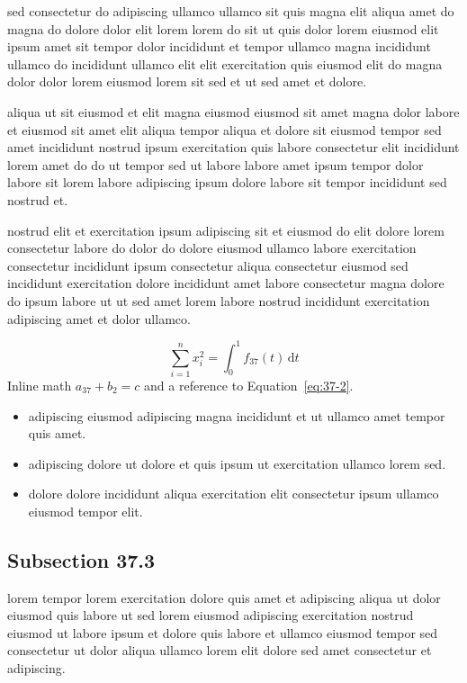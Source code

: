 \documentclass{article}
\begin{document}
sed consectetur do adipiscing ullamco ullamco sit quis magna elit aliqua amet do magna do dolore dolor elit lorem lorem do sit ut quis dolor lorem eiusmod elit ipsum amet sit tempor dolor incididunt et tempor ullamco magna incididunt ullamco do incididunt ullamco elit elit exercitation quis eiusmod elit do magna dolor dolor lorem eiusmod lorem sit sed et ut sed amet et dolore.

aliqua ut sit eiusmod et elit magna eiusmod eiusmod sit amet magna dolor labore et eiusmod sit amet elit aliqua tempor aliqua et dolore sit eiusmod tempor sed amet incididunt nostrud ipsum exercitation quis labore consectetur elit incididunt lorem amet do do ut tempor sed ut labore labore amet ipsum tempor dolor labore sit lorem labore adipiscing ipsum dolore labore sit tempor incididunt sed nostrud et.

nostrud elit et exercitation ipsum adipiscing sit et eiusmod do elit dolore lorem consectetur labore do dolor do dolore eiusmod ullamco labore exercitation consectetur incididunt ipsum consectetur aliqua consectetur eiusmod sed incididunt exercitation dolore incididunt amet labore consectetur magna dolore do ipsum labore ut ut sed amet lorem labore nostrud incididunt exercitation adipiscing amet et dolor ullamco.

\begin{equation}\label{eq:37-2}
  \sum_{i=1}^{n} x_i^{2} = \int_0^1 f_{37}(t)\,\mathrm{d}t
\end{equation}
Inline math $a_{37} + b_{2} = c$ and a reference to Equation~\eqref{eq:37-2}.

\begin{itemize}
  \item adipiscing eiusmod adipiscing magna incididunt et ut ullamco amet tempor quis amet.
  \item adipiscing dolore ut dolore et quis ipsum ut exercitation ullamco lorem sed.
  \item dolore dolore incididunt aliqua exercitation elit consectetur ipsum ullamco eiusmod tempor elit.
\end{itemize}

\subsection{Subsection 37.3}\label{sec:37-3}
lorem tempor lorem exercitation dolore quis amet et adipiscing aliqua ut dolor eiusmod quis labore ut sed lorem eiusmod adipiscing exercitation nostrud eiusmod ut labore ipsum et dolore quis labore et ullamco eiusmod tempor sed consectetur ut dolor aliqua ullamco lorem elit dolore sed amet consectetur et adipiscing.
\end{document}
